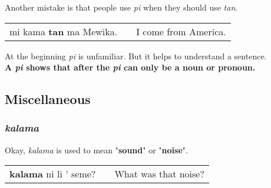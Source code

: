 %
%
%
%
%
Another mistake is that people use \textit{pi} when they should use \textit{tan}. 

\begin{supertabular}{p{5,5cm}|ll}
mi kama \textbf{tan} ma Mewika. && I come from America. \\
\end{supertabular}  

At the beginning \textit{pi} is unfamiliar. 
But it helps to understand a sentence. \\
\textbf{A \textit{pi} shows that after the \textit{pi} can only be a noun or pronoun.}

%
\newpage
\subsection*{Miscellaneous}
%
\subsubsection*{\textit{kalama}}
%
Okay, \textit{kalama} is used to mean "\textbf{sound}" or "\textbf{noise}".  \\
\begin{supertabular}{p{5,5cm}|ll}
\textbf{kalama} ni li ' seme? && What was that noise? \\
\end{supertabular}  

